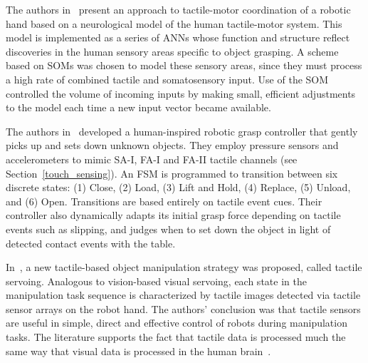 
The authors in~\cite{leoni1998implementing} present an approach to tactile-motor coordination of a robotic hand based on a neurological model of the human tactile-motor system.
This model is implemented as a series of ANNs whose function and structure reflect discoveries in the human sensory areas specific to object grasping.
A scheme based on SOMs was chosen to model these sensory areas, since they must process a high rate of combined tactile and somatosensory input.
Use of the SOM controlled the volume of incoming inputs by making small, efficient adjustments to the model each time a new input vector became available.

The authors in~\cite{romano2011human} developed a human-inspired robotic grasp controller that gently picks up and sets down unknown objects.
They employ pressure sensors and accelerometers to mimic SA-I, FA-I and FA-II tactile channels (see Section~\ref{touch_sensing}).
An FSM is programmed to transition between six discrete states: (1) Close, (2) Load, (3) Lift and Hold, (4) Replace, (5) Unload, and (6) Open.
Transitions are based entirely on tactile event cues.
Their controller also dynamically adapts its initial grasp force depending on tactile events such as slipping, and judges when to set down the object in light of detected contact events with the table.

In~\cite{sikka1994tactile}, a new tactile-based object manipulation strategy was proposed, called tactile servoing.
Analogous to vision-based visual servoing, each state in the manipulation task sequence is characterized by tactile images detected via tactile sensor arrays on the robot hand.
The authors' conclusion was that tactile sensors are useful in simple, direct and effective control of robots during manipulation tasks.
The literature supports the fact that tactile data is processed much the same way that visual data is processed in the human brain~\cite{johansson2001eye, scilingo2004perception}.

